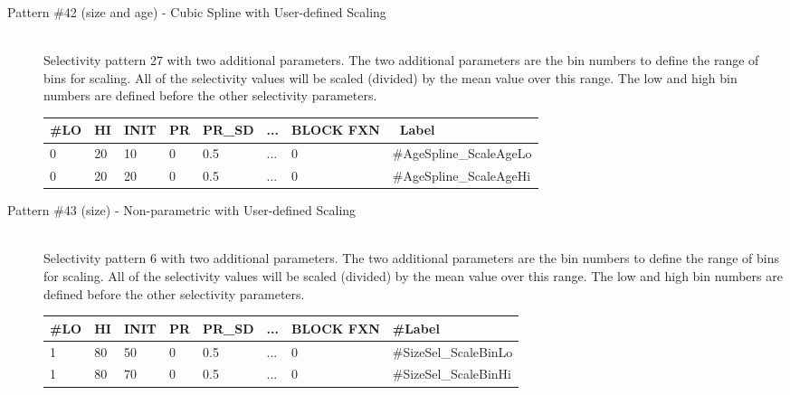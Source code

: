 \begin{description}
	\item[Pattern \#42 (size and age) - Cubic Spline with User-defined Scaling]\hfil\\
	Selectivity pattern 27 with two additional parameters. The two additional parameters are the bin numbers to define the range of bins for scaling. All of the selectivity values will be scaled (divided) by the mean value over this range. The low and high bin numbers are defined before the other selectivity parameters.

	\begin{center}
		\begin{longtable}{p{0.8cm} p{0.8cm} p{1cm} p{0.8cm} p{1.75cm}p{1cm} p{1.2cm} p{5.2cm}}
		\hline
		\#LO & HI & INIT & PR & PR\_SD & ... & BLOCK FXN & \ Label \\
		\hline
		0 & 20 & 10 & 0 & 0.5 &  ... & 0 & \#AgeSpline\_ScaleAgeLo \\
		0 & 20 & 20 & 0 & 0.5 & ... & 0 & \#AgeSpline\_ScaleAgeHi \\
		\hline
		\end{longtable}
	\end{center}
\end{description}


\begin{description}
	\item[Pattern \#43 (size) - Non-parametric with User-defined Scaling]\hfil\\
	Selectivity pattern 6 with two additional parameters. The two additional parameters are the bin numbers to define the range of bins for scaling. All of the selectivity values will be scaled (divided) by the mean value over this range. The low and high bin numbers are defined before the other selectivity parameters.

	\begin{center}
		\begin{longtable}{p{0.8cm} p{0.8cm} p{1cm} p{0.8cm} p{1.75cm}p{1cm} p{1.2cm} p{5.2cm}}
			\hline
			\#LO & HI & INIT & PR & PR\_SD  & ... & BLOCK FXN & \#Label \\
			\hline
			1 & 80 & 50 & 0 & 0.5  & ... & 0 & \#SizeSel\_ScaleBinLo \\
			1 & 80 & 70 & 0 & 0.5  & ... & 0 & \#SizeSel\_ScaleBinHi \\
			\hline
		\end{longtable}
	\end{center}
\end{description}


